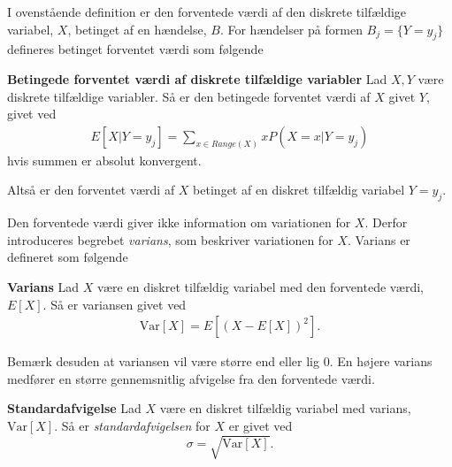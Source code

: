 I ovenstående definition er den forventede værdi af den diskrete tilfældige variabel, $X$, betinget af en hændelse, $B$. For hændelser på formen $B_j = \{Y=y_j\}$ defineres betinget forventet værdi som følgende 

\begin{minipage}\textwidth
\begin{defn}\textbf{Betingede forventet værdi af diskrete tilfældige variabler}\label{def:betinget_forventet_værdi_af_diskrete_tilfældige_variabler} %
\newline
Lad $X, Y$ være diskrete tilfældige variabler. Så er den betingede forventet værdi af $X$ givet $Y$, givet ved
\begin{align*}
    E[X|Y=y_j] = \sum_{x\in Range(X)}xP(X=x|Y=y_j)
\end{align*}
hvis summen er absolut konvergent.
\end{defn}
\end{minipage}

Altså er den forventet værdi af $X$ betinget af en diskret tilfældig variabel $Y=y_j$.

Den forventede værdi giver ikke information om variationen for $X$. Derfor introduceres begrebet \textit{varians}, som beskriver variationen for $X$. Varians er defineret som følgende

\begin{minipage}\textwidth
\begin{defn}\textbf{Varians}\label{def:varians} %
\newline
Lad $X$ være en diskret tilfældig variabel med den forventede værdi, $E[X]$. Så er variansen givet ved
\begin{align*}
    \text{Var}[X]=E\left[\left(X-E[X]\right)^2\right].
\end{align*}
\end{defn}
\end{minipage}



Bemærk desuden at variansen vil være større end eller lig $0$. En højere varians medfører en større gennemsnitlig afvigelse fra den forventede værdi. 

\begin{minipage}\textwidth
\begin{defn}\textbf{Standardafvigelse} %
\newline
Lad $X$ være en diskret tilfældig variabel med varians, $\text{Var}[X]$. Så er \textit{standardafvigelsen} for $X$ er givet ved 
$$\sigma = \sqrt{\text{Var}[X]}.$$
\end{defn}
\end{minipage}

